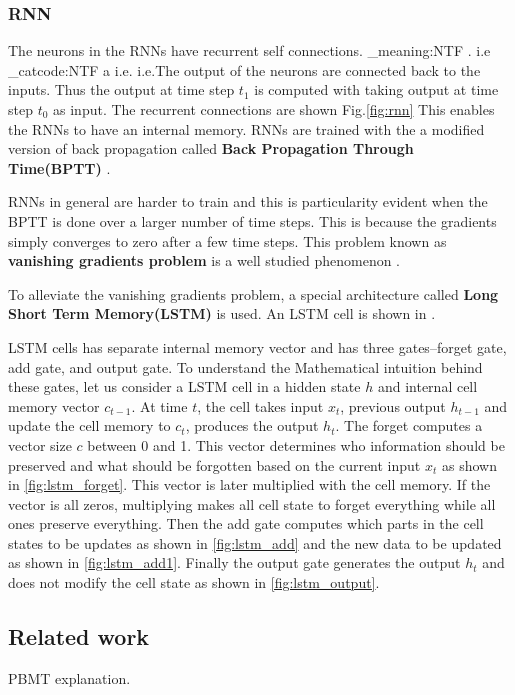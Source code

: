\documentclass[conference]{IEEEtran}
\makeatletter
\newcommand\latinabbrev[1]{
  \peek_meaning:NTF . {%
    #1\@}%
  { \peek_catcode:NTF a {%
      #1.\@ }%
    {#1.\@}}}
\def\ie{\latinabbrev{i.e}}
\makeatother
\begin{document}
\subsubsection{RNN}
The neurons in the RNNs have recurrent self connections. \ie The output of the neurons are connected back to the inputs. Thus the output at time step $t_1$ is computed with taking output at time step $t_0$ as input. The recurrent connections are shown Fig.\ref{fig:rnn} This enables the RNNs to have an internal memory. RNNs are trained with the a modified version of back propagation called \textbf{Back Propagation Through Time(BPTT)}  \cite{werbos1990backpropagation}.

RNNs in general are harder to train and this is particularity evident when the BPTT is done over a larger number of time steps. This is because the gradients simply converges to zero after a few time steps. This problem known as \textbf{vanishing gradients problem} is a well studied phenomenon \cite{bengio1994learning}.  

To alleviate the vanishing gradients problem, a special architecture called \textbf{Long Short Term Memory(LSTM)} \cite{hochreiter1997long} is used. An LSTM cell is shown in \label{fig:lstm}.

LSTM cells has separate internal memory vector and has three gates--forget gate, add gate, and output gate. To understand the Mathematical intuition behind these gates, let us consider a LSTM cell in a hidden state $h$ and internal cell memory vector $c_{t-1}$. At time $t$, the cell takes input $x_t$, previous output $h_{t-1}$ and update the cell memory to $c_{t}$, produces the output $h_{t}$. The forget computes a vector size $c$ between 0 and 1. This vector determines who information should be preserved and what should be forgotten based on the current input $x_t$ as shown in \ref{fig:lstm_forget}. This vector is later multiplied with the cell memory. If the vector is all zeros, multiplying makes all cell state to forget everything while all ones preserve everything. Then the add gate computes which parts in the cell states to be updates as shown in  \ref{fig:lstm_add} and the new data to be updated as shown in \ref{fig:lstm_add1}. Finally the output gate generates the output $h_t$ and does not modify the cell state as shown in \ref{fig:lstm_output}.



\subsection{Related work}
PBMT explanation. \cite{koehn2003statistical} 
\end{document}
